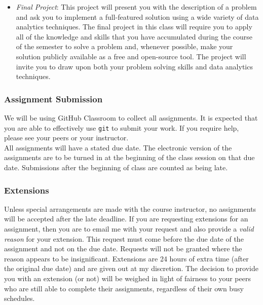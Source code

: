 \documentclass[11pt]{article} %
\begin{document}
\begin{itemize}

  \item {\em Final Project}: This project will present you with the description of a problem and ask you to implement a full-featured solution using a wide variety of data analytics techniques. The final project in this class will require you to apply all of the knowledge and skills that you have accumulated during the course of the semester to solve a problem and, whenever possible, make your solution publicly available as a free and open-source tool. The project will invite you to draw upon both your problem solving skills and data analytics techniques. %

\end{itemize}


\subsubsection*{\textbf{Assignment Submission}}

We will be using GitHub Classroom to collect all assignments. It is expected that you are able to effectively use {\tt git} to submit your work. If you require help, please see your peers or your instructor.\\

All assignments will have a stated due date. \color{red} The electronic version of the  assignments are to be turned in at the beginning of the class session on that due date. Submissions after the beginning of class are counted as being late.   \color{black} 


\subsubsection*{\textbf{Extensions}}
Unless special arrangements are made with the course instructor, no assignments will be accepted after the late deadline. If you are requesting extensions for an assignment, then you are to email me with your request and also provide a \emph{valid reason} for your extension. This request must come before the due date of the assignment and not on the due date. Requests will not be granted where the reason appears to be insignificant. Extensions are 24 hours of extra time (after the original due date) and are given out at my discretion. The decision to provide you with an extension (or not) will be weighed in light of fairness to your peers who are still able to complete their assignments, regardless of their own busy schedules. 
\end{document}

